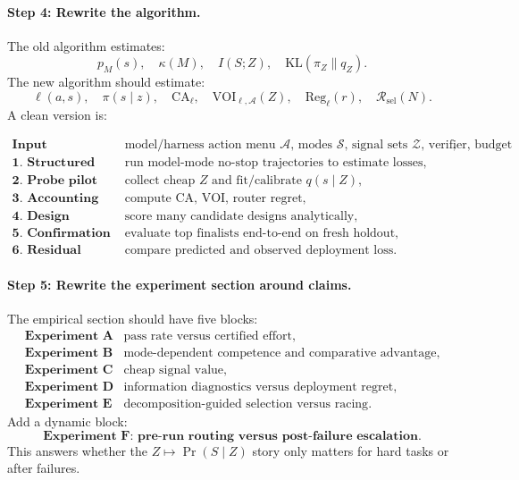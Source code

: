 \documentclass{article}
\providecommand{\KL}{\mathrm{KL}}
\begin{document}
\paragraph{Step 4: Rewrite the algorithm.}
The old algorithm estimates:
\[
    p_M(s),\quad \kappa(M),\quad I(S;Z),\quad \KL(\pi_Z\|q_Z).
\]
The new algorithm should estimate:
\[
    \ell(a,s),\quad
    \pi(s\mid z),\quad
    \mathrm{CA}_\ell,\quad
    \mathrm{VOI}_{\ell,\mathcal A}(Z),\quad
    \mathrm{Reg}_\ell(r),\quad
    \mathcal R_{\mathrm{sel}}(N).
\]
A clean version is:

\[
\begin{array}{ll}
    \textbf{Input} &
    \text{model/harness action menu \(\mathcal A\), modes \(\mathcal S\),
    signal sets \(\mathcal Z\), verifier, budget},\\
    \textbf{1. Structured pilot} &
    \text{run model-mode no-stop trajectories to estimate losses},\\
    \textbf{2. Probe pilot} &
    \text{collect cheap \(Z\) and fit/calibrate \(q(s\mid Z)\)},\\
    \textbf{3. Accounting} &
    \text{compute \(\mathrm{CA}\), \(\mathrm{VOI}\), router regret},\\
    \textbf{4. Design scoring} &
    \text{score many candidate designs analytically},\\
    \textbf{5. Confirmation} &
    \text{evaluate top finalists end-to-end on fresh holdout},\\
    \textbf{6. Residual audit} &
    \text{compare predicted and observed deployment loss}.
\end{array}
\]

\paragraph{Step 5: Rewrite the experiment section around claims.}
The empirical section should have five blocks:
\[
\begin{array}{ll}
    \textbf{Experiment A} & \text{pass rate versus certified effort},\\
    \textbf{Experiment B} & \text{mode-dependent competence and comparative advantage},\\
    \textbf{Experiment C} & \text{cheap signal value},\\
    \textbf{Experiment D} & \text{information diagnostics versus deployment regret},\\
    \textbf{Experiment E} & \text{decomposition-guided selection versus racing}.
\end{array}
\]
Add a dynamic block:
\[
    \textbf{Experiment F: pre-run routing versus post-failure escalation}.
\]
This answers whether the \(Z\mapsto \Pr(S\mid Z)\) story only matters for hard tasks or
after failures.
\end{document}

